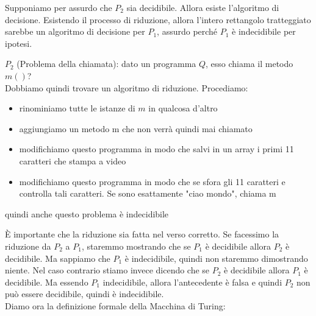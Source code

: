 	Supponiamo per assurdo che $P_2$ sia decidibile. Allora esiste l'algoritmo di decisione. Esistendo il
	processo di riduzione, allora l'intero rettangolo tratteggiato sarebbe un algoritmo di decisione per
$P_1$, assurdo perché $P_1$ è indecidibile per ipotesi.
	\begin{example}
		$P_2$ (Problema della chiamata): dato un programma $Q$, esso chiama il metodo $m()$?
		\\Dobbiamo quindi trovare un algoritmo di riduzione. Procediamo:
		\begin{itemize}
			\item rinominiamo tutte le istanze di $m$ in qualcosa d'altro
			\item aggiungiamo un metodo m che non verrà quindi mai chiamato
			\item modifichiamo questo programma in modo che salvi in un array i primi 11 caratteri che stampa a video
			\item modifichiamo questo programma in modo che se sfora gli 11 caratteri e controlla tali caratteri. Se sono esattamente "ciao mondo", chiama m
		\end{itemize}
		quindi anche questo problema è indecidibile
	\end{example}
	È importante che la riduzione sia fatta nel verso corretto. Se facessimo la riduzione da $P_2$ a $P_1$,
	staremmo mostrando che se $P_1$ è decidibile allora $P_2$ è decidibile. Ma sappiamo che $P_1$ è
	indecidibile, quindi non staremmo dimostrando niente.
	Nel caso contrario stiamo invece dicendo che se $P_2$ è decidibile allora $P_1$ è decidibile. Ma essendo
$P_1$ indecidibile, allora l'antecedente è falsa e quindi $P_2$ non può essere decidibile, quindi è
	indecidibile.\\
	Diamo ora la definizione formale della Macchina di Turing:
